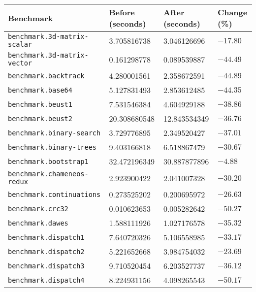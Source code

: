 
\begin{longtable}{llll}
\toprule
Benchmark & Before (seconds) & After (seconds) & Change (\%) \\
\midrule
\endhead
\texttt{benchmark.3d-matrix-scalar}         & 3.705816738       & 3.046126696         & $-17.80$    \\
\texttt{benchmark.3d-matrix-vector}         & 0.161298778       & 0.089539887         & $-44.49$    \\
\texttt{benchmark.backtrack}                & 4.280001561       & 2.358672591         & $-44.89$    \\
\texttt{benchmark.base64}                   & 5.127831493       & 2.853612485         & $-44.35$    \\
\texttt{benchmark.beust1}                   & 7.531546384       & 4.604929188         & $-38.86$    \\
\texttt{benchmark.beust2}                   & 20.308680548      & 12.843534349        & $-36.76$    \\
\texttt{benchmark.binary-search}            & 3.729776895       & 2.349520427         & $-37.01$    \\
\texttt{benchmark.binary-trees}             & 9.403166818       & 6.518867479         & $-30.67$    \\
\texttt{benchmark.bootstrap1}               & 32.472196349      & 30.887877896        & $-4.88$     \\
\texttt{benchmark.chameneos-redux}          & 2.923900422       & 2.041007328         & $-30.20$    \\
\texttt{benchmark.continuations}            & 0.273525202       & 0.200695972         & $-26.63$    \\
\texttt{benchmark.crc32}                    & 0.010623653       & 0.005282642         & $-50.27$    \\
\texttt{benchmark.dawes}                    & 1.588111926       & 1.027176578         & $-35.32$    \\
\texttt{benchmark.dispatch1}                & 7.640720326       & 5.106558985         & $-33.17$    \\
\texttt{benchmark.dispatch2}                & 5.221652668       & 3.984754032         & $-23.69$    \\
\texttt{benchmark.dispatch3}                & 9.710520454       & 6.203527737         & $-36.12$    \\
\texttt{benchmark.dispatch4}                & 8.224931156       & 4.098265543         & $-50.17$    \\

\end{longtable}
